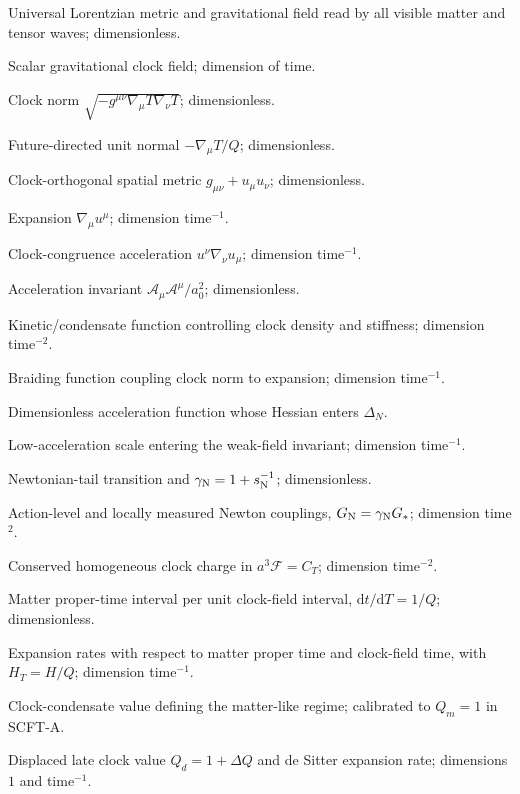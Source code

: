 \documentclass[aps,prd,reprint,onecolumn,notitlepage,nofootinbib,longbibliography,floatfix]{revtex4-2}
\theoremstyle{scstyle}
\theoremstyle{definition}
\theoremstyle{remark}
\newcommand{\dd}{\mathrm{d}}
\newcommand{\cK}{\mathcal K}
\newcommand{\cB}{\mathcal B}
\newcommand{\cJ}{\mathcal J}
\newcommand{\cA}{\mathcal A}
\newcommand{\cF}{\mathcal F}
\begin{document}
\begin{description}[style=nextline,leftmargin=3.2cm,labelwidth=2.8cm,font=\normalfont\bfseries]
\item[$g_{\mu\nu}$] Universal Lorentzian metric and gravitational field read by all visible matter and tensor waves; dimensionless.
\item[$T$] Scalar gravitational clock field; dimension of time.
\item[$Q$] Clock norm $\sqrt{-g^{\mu\nu}\nabla_\mu T\nabla_\nu T}$; dimensionless.
\item[$u_\mu$] Future-directed unit normal $-\nabla_\mu T/Q$; dimensionless.
\item[$h_{\mu\nu}$] Clock-orthogonal spatial metric $g_{\mu\nu}+u_\mu u_\nu$; dimensionless.
\item[$\Theta$] Expansion $\nabla_\mu u^\mu$; dimension time$^{-1}$.
\item[$\cA_\mu$] Clock-congruence acceleration $u^\nu\nabla_\nu u_\mu$; dimension time$^{-1}$.
\item[$Y$] Acceleration invariant $\cA_\mu\cA^\mu/a_0^2$; dimensionless.
\item[$\cK(Q)$] Kinetic/condensate function controlling clock density and stiffness; dimension time$^{-2}$.
\item[$\cB(Q)$] Braiding function coupling clock norm to expansion; dimension time$^{-1}$.
\item[$\cJ(Y)$] Dimensionless acceleration function whose Hessian enters $\Delta_N$.
\item[$a_0$] Low-acceleration scale entering the weak-field invariant; dimension time$^{-1}$.
\item[$s_{\rm N},\gamma_{\rm N}$] Newtonian-tail transition and $\gamma_{\rm N}=1+s_{\rm N}^{-1}$; dimensionless.
\item[$G_*,G_{\rm N}$] Action-level and locally measured Newton couplings, $G_{\rm N}=\gamma_{\rm N}G_*$; dimension time$^2$.
\item[$C_T$] Conserved homogeneous clock charge in $a^3\cF=C_T$; dimension time$^{-2}$.
\item[$\mathcal N_T$] Matter proper-time interval per unit clock-field interval, $\dd t/\dd T=1/Q$; dimensionless.
\item[$H,H_T$] Expansion rates with respect to matter proper time and clock-field time, with $H_T=H/Q$; dimension time$^{-1}$.
\item[$Q_m$] Clock-condensate value defining the matter-like regime; calibrated to $Q_m=1$ in SCFT-A.
\item[$Q_d,H_d$] Displaced late clock value $Q_d=1+\Delta Q$ and de Sitter expansion rate; dimensions $1$ and time$^{-1}$.

\end{description}
\end{document}
